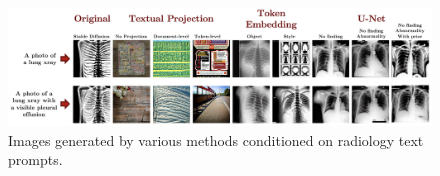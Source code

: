 \documentclass{article}
\begin{document}
\begin{figure}
  \centering
    \includegraphics[width=140mm]{imagegenerationmethods.png}
  \caption{Images generated by various methods conditioned on radiology text prompts.}
  \label{figure-comparison-generation-methods}
\end{figure}

\vspace{2em}

\begin{table}[bt!]
\caption{Evaluation of the quality of generated images with different methods for adapting stable diffusion to the radiology domain. Scores represent the Fréchet inception distance (FID), and lower scores mean better generated images.}
\label{image-generation-table}
\centering
{}
\end{table}
\end{document}
